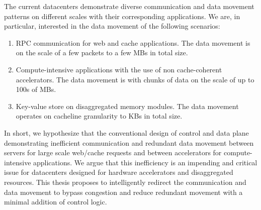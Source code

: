%
The current datacenters demonstrate diverse communication and data movement patterns on different scales with their corresponding applications.
% 
We are, in particular, interested in the data movement of the following scenarios:
\begin{enumerate}[noitemsep]
    \item RPC communication for web and cache applications. The data movement is on the scale of a few packets to a few MBs in total size.
    \item Compute-intensive applications with the use of non cache-coherent accelerators.
    The data movement is with chunks of data on the scale of up to 100s of MBs.
    \item Key-value store on disaggregated memory modules. The data movement operates on cacheline granularity to KBs in total size.  
\end{enumerate} 
%
In short, we hypothesize that the conventional design of control and data plane demonstrating inefficient communication and redundant data movement between servers for large scale web/cache requests and between accelerators for compute-intensive applications.
%
We argue that this inefficiency is an impending and critical issue for datacenters designed for hardware accelerators and disaggregated resources.
%
This thesis proposes to intelligently redirect the communication and data movement to bypass congestion and reduce redundant movement with a minimal addition of control logic. 
%




%
